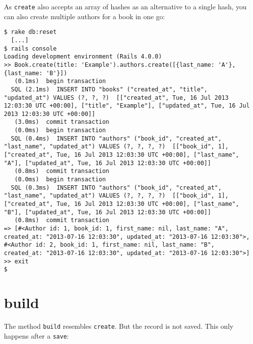 \documentclass[a4paper]{book}
\begin{document}
As \texttt{create} also accepts an array of hashes as an alternative to a single hash, you can also create multiple authors for a book in one go:

\begin{shaded}\begin{verbatim}
$ rake db:reset
  [...]
$ rails console
Loading development environment (Rails 4.0.0)
>> Book.create(title: 'Example').authors.create([{last_name: 'A'}, {last_name: 'B'}])
   (0.1ms)  begin transaction
  SQL (2.1ms)  INSERT INTO "books" ("created_at", "title", "updated_at") VALUES (?, ?, ?)  [["created_at", Tue, 16 Jul 2013 12:03:30 UTC +00:00], ["title", "Example"], ["updated_at", Tue, 16 Jul 2013 12:03:30 UTC +00:00]]
   (3.0ms)  commit transaction
   (0.0ms)  begin transaction
  SQL (0.4ms)  INSERT INTO "authors" ("book_id", "created_at", "last_name", "updated_at") VALUES (?, ?, ?, ?)  [["book_id", 1], ["created_at", Tue, 16 Jul 2013 12:03:30 UTC +00:00], ["last_name", "A"], ["updated_at", Tue, 16 Jul 2013 12:03:30 UTC +00:00]]
   (0.8ms)  commit transaction
   (0.0ms)  begin transaction
  SQL (0.3ms)  INSERT INTO "authors" ("book_id", "created_at", "last_name", "updated_at") VALUES (?, ?, ?, ?)  [["book_id", 1], ["created_at", Tue, 16 Jul 2013 12:03:30 UTC +00:00], ["last_name", "B"], ["updated_at", Tue, 16 Jul 2013 12:03:30 UTC +00:00]]
   (0.8ms)  commit transaction
=> [#<Author id: 1, book_id: 1, first_name: nil, last_name: "A", created_at: "2013-07-16 12:03:30", updated_at: "2013-07-16 12:03:30">, #<Author id: 2, book_id: 1, first_name: nil, last_name: "B", created_at: "2013-07-16 12:03:30", updated_at: "2013-07-16 12:03:30">]
>> exit
$
\end{verbatim}\end{shaded}

\section{build}\label{build}

The method \texttt{build} resembles \texttt{create}. But the record is not saved. This only happens after a \texttt{save}:
\end{document}
